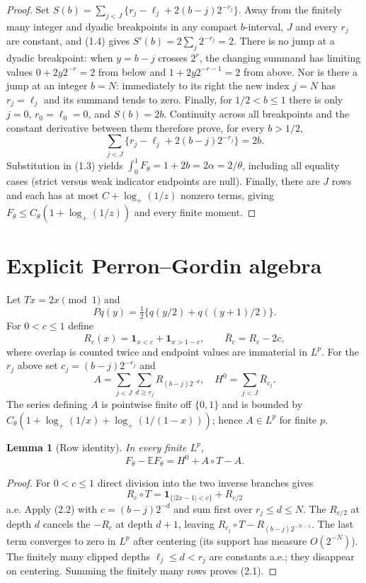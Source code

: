 \documentclass[11pt]{article}
\numberwithin{equation}{section}
\newtheorem{lemma}[theorem]{Lemma}
\newcommand{\E}{\mathbb E}\newcommand{\Pp}{\mathbb P}
\newcommand{\1}{\mathbf 1}\newcommand{\F}{\mathcal F}\newcommand{\D}{\mathcal D}
\begin{document}
\begin{proof}
Set $S(b)=\sum_{j<J}\{r_j-\ell_j+2(b-j)2^{-r_j}\}$.  Away
from the finitely many integer and dyadic breakpoints in any compact
$b$-interval, $J$ and every $r_j$ are constant, and (1.4) gives
$S'(b)=2\sum_j2^{-r_j}=2$.  There is no jump at a dyadic breakpoint:
when $y=b-j$ crosses $2^r$, the changing summand has limiting values
$0+2y2^{-r}=2$ from below and $1+2y2^{-r-1}=2$ from above.  Nor is there a
jump at an integer $b=N$: immediately to its right the new index $j=N$ has
$r_j=\ell_j$ and its summand tends to zero.  Finally, for
$1/2<b\leq1$ there is only $j=0$, $r_0=\ell_0=0$, and $S(b)=2b$.
Continuity across all breakpoints and the constant derivative between them
therefore prove, for every $b>1/2$,
\begin{equation}
 \sum_{j<J}\{r_j-\ell_j+2(b-j)2^{-r_j}\}=2b.              \tag{1.5}
\end{equation}
Substitution in (1.3) yields
$\int_0^1F_\theta=1+2b=2\alpha=2/\theta$, including all equality
cases (strict versus weak indicator endpoints are null).  Finally, there are
$J$ rows and each has at most $C+\log_+(1/z)$ nonzero terms, giving
$F_\theta\leq C_\theta(1+\log_+(1/z))$ and every finite moment.
\end{proof}

\section{Explicit Perron--Gordin algebra}
Let $T x=2x\pmod1$ and
\[
 Pq(y)=\tfrac12\{q(y/2)+q((y+1)/2)\}.
\]
For $0<c\leq1$ define
\[
 R_c(x)=\1_{x<c}+\1_{x>1-c},\qquad \bar R_c=R_c-2c,
\]
where overlap is counted twice and endpoint values are immaterial in $L^p$.
For the $r_j$ above set $c_j=(b-j)2^{-r_j}$ and
\[
 A=\sum_{j<J}\sum_{d\geq r_j}R_{(b-j)2^{-d}},\quad
 H^0=\sum_{j<J}\bar R_{c_j}.
\]
The series defining $A$ is pointwise finite off $\{0,1\}$ and is bounded by
$C_\theta(1+\log_+(1/x)+\log_+(1/(1-x)))$; hence $A\in L^p$ for finite $p$.

\begin{lemma}[Row identity]
In every finite $L^p$,
\begin{equation}F_\theta-\E F_\theta=H^0+A\circ T-A.            \tag{2.1}\end{equation}
\end{lemma}
\begin{proof}
For $0<c\leq1$ direct division into the two inverse branches gives
\begin{equation}R_c\circ T=\1_{\{|2x-1|<c\}}+R_{c/2}           \tag{2.2}\end{equation}
a.e.  Apply (2.2) with $c=(b-j)2^{-d}$ and sum first over
$r_j\leq d\leq N$.  The $R_{c/2}$ at depth $d$ cancels the $-R_c$ at depth
$d+1$, leaving $R_{c_j}\circ T-R_{(b-j)2^{-N-1}}$.  The last term converges
to zero in $L^p$ after centering (its support has measure $O(2^{-N})$).
The finitely many clipped depths $\ell_j\leq d<r_j$ are constants a.e.;
they disappear on centering.  Summing the finitely many rows proves (2.1).
\end{proof}
\end{document}
